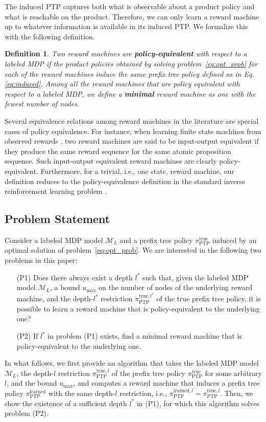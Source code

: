 \documentclass[letterpaper, 10 pt, conference]{ieeeconf}
\newtheorem{definition}{\textbf{Definition}}
\newcommand{\ptp}{\pi_{\mathrm{PTP}}}
\begin{document}
The induced PTP captures both what is observable about a product policy and what is reachable on the product. Therefore, we can only learn a reward machine up to whatever information is available in its induced PTP. We formalize this with the following definition.

\begin{definition}
   Two reward machines are \textbf{policy-equivalent} with respect to a labeled MDP if the product policies obtained by solving problem~\eqref{eq:opt_prob} for each of the reward machines induce the same prefix tree policy defined as in Eq. \eqref{eq:induced}. Among all the reward machines that are policy equivalent with respect to a labeled MDP, we define a \textbf{minimal} reward machine as one with the fewest number of nodes.
\end{definition}

Several equivalence relations among reward machines in the literature are special cases of policy equivalence. For instance, when learning finite state machines from observed rewards \cite{xu2020joint, giantamidis2021learning}, two reward machines are said to be input-output equivalent if they produce the same reward sequence for the same atomic proposition sequence. Such input-output equivalent reward machines are clearly policy-equivalent. Furthermore, for a trivial, i.e., one state, reward machine, our definition reduces to the policy-equivalence definition in the standard inverse reinforcement learning problem \cite{shehab2024learning, cao2021identifiability}.

\subsection{Problem Statement}\label{sec:prob_stat}

Consider a labeled MDP model $\mathcal{M}_L$ and a prefix tree policy $\ptp^{\mathrm{true}}$ induced by an optimal solution of problem~\eqref{eq:opt_prob}. We are interested in the following two problems in this paper:
\begin{enumerate}
\item[(P1)] Does there always exist a depth $l^*$ such that, given the labeled MDP model $\mathcal{M}_L$, a bound $u_{\mathrm{max}}$ on the number of nodes of the underlying reward machine, and the  depth-$l^*$ restriction $\ptp^{\mathrm{true},l^*}$ of the true prefix tree policy, it is possible to learn a reward machine that is policy-equivalent to the underlying one?
\item[(P2)] If $l^*$ in problem (P1) exists, find a minimal reward machine that is policy-equivalent to the underlying one.
\end{enumerate}
In what follows, we first provide an algorithm that takes the labeled MDP model $\mathcal{M}_L$, the depth-$l$ restriction $\ptp^{\mathrm{true},l}$ of the prefix tree policy $\ptp^{\mathrm{true}}$ for some arbitrary $l$, and the bound $u_{\mathrm{max}}$, and computes a reward machine that induces a prefix tree policy $\ptp^{\mathrm{learned}}$ with the same depth-$l$ restriction, i.e., $\ptp^{\mathrm{learned},l}=\ptp^{\mathrm{true},l}$. Then, we show the existence of a sufficient depth $l^*$ in (P1), for which this algorithm solves problem (P2).
\end{document}
